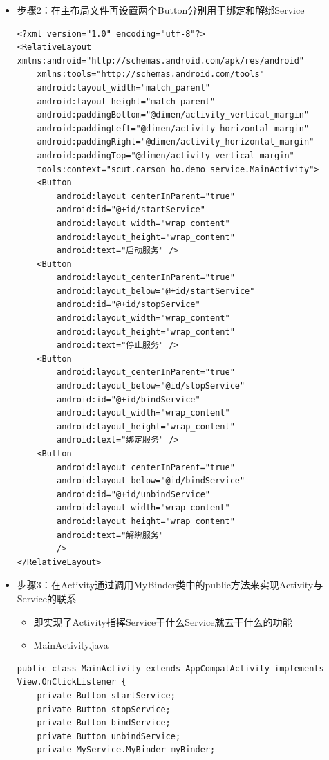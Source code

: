 \documentclass[9pt, b5paper]{article}
\begin{document}
\begin{enumerate}
\begin{itemize}
\item 步骤2：在主布局文件再设置两个Button分别用于绑定和解绑Service
\begin{verbatim}
<?xml version="1.0" encoding="utf-8"?>
<RelativeLayout xmlns:android="http://schemas.android.com/apk/res/android"
    xmlns:tools="http://schemas.android.com/tools"
    android:layout_width="match_parent"
    android:layout_height="match_parent"
    android:paddingBottom="@dimen/activity_vertical_margin"
    android:paddingLeft="@dimen/activity_horizontal_margin"
    android:paddingRight="@dimen/activity_horizontal_margin"
    android:paddingTop="@dimen/activity_vertical_margin"
    tools:context="scut.carson_ho.demo_service.MainActivity">
    <Button
        android:layout_centerInParent="true"
        android:id="@+id/startService"
        android:layout_width="wrap_content"
        android:layout_height="wrap_content"
        android:text="启动服务" />
    <Button
        android:layout_centerInParent="true"
        android:layout_below="@+id/startService"
        android:id="@+id/stopService"
        android:layout_width="wrap_content"
        android:layout_height="wrap_content"
        android:text="停止服务" />
    <Button
        android:layout_centerInParent="true"
        android:layout_below="@id/stopService"
        android:id="@+id/bindService"
        android:layout_width="wrap_content"
        android:layout_height="wrap_content"
        android:text="绑定服务" />
    <Button
        android:layout_centerInParent="true"
        android:layout_below="@id/bindService"
        android:id="@+id/unbindService"
        android:layout_width="wrap_content"
        android:layout_height="wrap_content"
        android:text="解绑服务"
        />
</RelativeLayout>
\end{verbatim}
\item 步骤3：在Activity通过调用MyBinder类中的public方法来实现Activity与Service的联系
\begin{itemize}
\item 即实现了Activity指挥Service干什么Service就去干什么的功能
\item MainActivity.java
\end{itemize}
\begin{verbatim}
public class MainActivity extends AppCompatActivity implements View.OnClickListener {
    private Button startService;
    private Button stopService;
    private Button bindService;
    private Button unbindService;
    private MyService.MyBinder myBinder;
    

\end{verbatim}
\end{itemize}
\end{enumerate}
\end{document}

